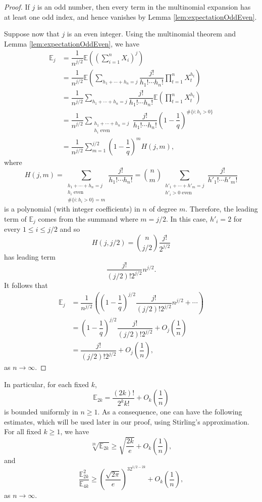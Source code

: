 \documentclass{amsart}
\theoremstyle{plain}
\theoremstyle{definition}
\newcommand{\EE}{\mathbb{E}}
\begin{document}
\begin{proof}
If $j$ is an odd number, then every term in the multinomial expansion has at least one odd index, and hence vanishes by Lemma \ref{lem:expectationOddEven}.

Suppose now that $j$ is an even integer. Using the multinomial theorem and Lemma \ref{lem:expectationOddEven}, we have
\[
\begin{split}
\EE_j
&=\dfrac{1}{n^{j/2}}\EE\left(\left(\sum_{i=1}^nX_i\right)^j\right)\\
&=\dfrac{1}{n^{j/2}}\EE\left(\sum_{h_1+\cdots+h_n=j}\dfrac{j!}{h_1!\cdots{h_n!}}\prod_{t=1}^nX_t^{h_t}\right)\\
&=\dfrac{1}{n^{j/2}}\sum_{h_1+\cdots+h_n=j}\dfrac{j!}{h_1!\cdots{h_n!}}\EE\left(\prod_{t=1}^nX_t^{h_t}\right)\\
&=\dfrac{1}{n^{j/2}}\sum_{\substack{h_1+\cdots+h_n=j\\h_i\text{ even}}}\dfrac{j!}{h_1!\cdots{h_n!}}\left(1-\dfrac{1}{q}\right)^{\#\{i:h_i>0\}}\\
&=\dfrac{1}{n^{j/2}}\sum_{m=1}^{j/2}\left(1-\dfrac{1}{q}\right)^mH(j,m),
\end{split}
\]
where
\[
H(j,m)=\sum_{\substack{h_1+\cdots+h_n=j\\h_i\text{ even}\\\#\{i:h_i>0\}=m}}\dfrac{j!}{h_1!\cdots{h_n!}}=\binom{n}{m}\sum_{\substack{h'_1+\cdots+h'_m=j\\h'_i>0\text{ even}}}\dfrac{j!}{h'_1!\cdots{h'_m!}}
\]
is a polynomial (with integer coefficients) in $n$ of degree $m$. Therefore, the leading term of $\EE_j$ comes from the summand where $m=j/2$. In this case, $h'_i=2$ for every $1\leq{i}\leq{j/2}$ and so
\[
H(j,j/2)=\binom{n}{j/2}\dfrac{j!}{2^{j/2}}
\]
has leading term
\[
\dfrac{j!}{(j/2)!2^{j/2}}n^{j/2}.
\]
It follows that
\[
\begin{split}
\EE_j
&=\dfrac{1}{n^{j/2}}\left(\left(1-\dfrac{1}{q}\right)^{j/2}\dfrac{j!}{(j/2)!2^{j/2}}n^{j/2}+\cdots\right)\\
&=\left(1-\dfrac{1}{q}\right)^{j/2}\dfrac{j!}{(j/2)!2^{j/2}}+O_j\left(\dfrac{1}{n}\right)\\
&=\dfrac{j!}{(j/2)!2^{j/2}}+O_j\left(\dfrac{1}{n}\right),
\end{split}
\]
as $n\to\infty$.
\end{proof}

In particular, for each fixed $k$,
\[
\EE_{2k}=\dfrac{(2k)!}{2^kk!}+O_k\left(\dfrac{1}{n}\right)
\]
is bounded uniformly in $n\geq1$. As a consequence, one can have the following estimates, which will be used later in our proof, using Stirling's approximation. For all fixed $k\geq1$, we have
\begin{equation}
\label{eq:2kRootE_2k}
\sqrt[2k]{\EE_{2k}}\geq\sqrt{\dfrac{2k}{e}}+O_k\left(\dfrac1n\right),
\end{equation}
and
\begin{equation}
\label{eq:E2k^2OverE4k}
\dfrac{\EE_{2k}^2}{\EE_{4k}}\geq\left(\dfrac{\sqrt{2\pi}}{e}\right)^32^{1/2-2k}+O_k\left(\dfrac1n\right),
\end{equation}
as $n\to\infty$.
\end{document}
